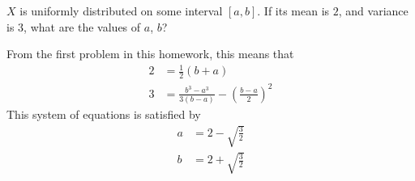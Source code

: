 \begin{problem}[Handout 12, \# 23]
  \(X\) is uniformly distributed on some interval \([a,b]\). If its mean is
  \(2\), and variance is \(3\), what are the values of \(a\), \(b\)?
\end{problem}
\begin{solution}
  From the first problem in this homework, this means that
  \begin{align*}
    2 &= \frac{1}{2} (b+a)\\
    3 &= \frac{b^3-a^3}{3(b-a)} - \left(\frac{b-a}{2}\right)^2
  \end{align*}
  This system of equations is satisfied by
  \begin{align*}
    a&= 2-\sqrt{\frac{3}{2}} \\
    b&= 2+\sqrt{\frac{3}{2}}
  \end{align*}
\end{solution}

